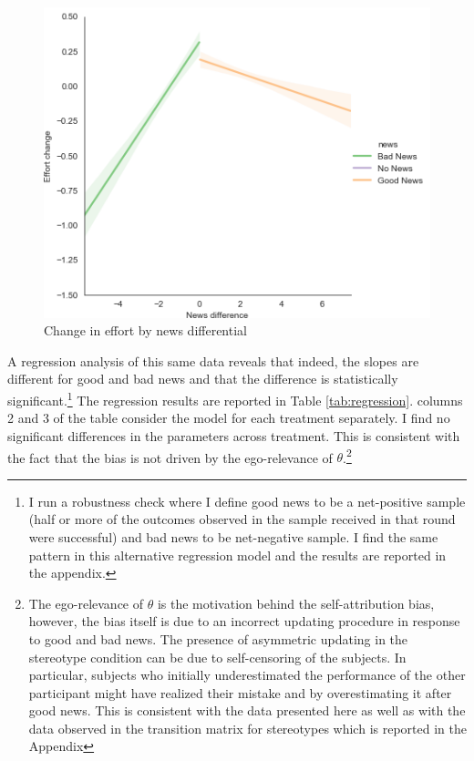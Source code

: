 \documentclass[
  12pt,
]{article}
\begin{document}
\begin{figure}
\hypertarget{fig:reaction-news}{%
\centering
\includegraphics{../figures/effort_change_news.png}
\caption{Change in effort by news differential}\label{fig:reaction-news}
}
\end{figure}

A regression analysis of this same data reveals that indeed, the slopes
are different for good and bad news and that the difference is
statistically
significant.\footnote{I run a robustness check where I define good news to be a net-positive sample (half or more of the outcomes observed in the sample received in that round were successful) and bad news to be net-negative sample. I find the same pattern in this alternative regression model and the results are reported in the appendix.}
The regression results are reported in Table \ref{tab:regression}.
columns 2 and 3 of the table consider the model for each treatment
separately. I find no significant differences in the parameters across
treatment. This is consistent with the fact that the bias is not driven
by the ego-relevance of
\(\theta\).\footnote{The ego-relevance of $\theta$ is the motivation behind the self-attribution bias, however, the bias itself is due to an incorrect updating procedure in response to good and bad news. The presence of asymmetric updating in the stereotype condition can be due to self-censoring of the subjects. In particular, subjects who initially underestimated the performance of the other participant might have realized their mistake and by overestimating it after good news. This is consistent with the data presented here as well as with the data observed in the transition matrix for stereotypes which is reported in the Appendix}
\end{document}
